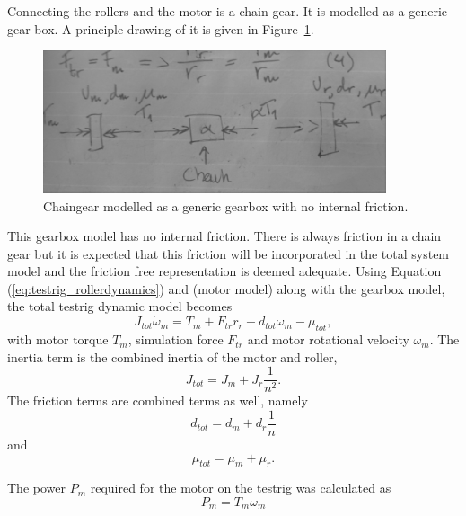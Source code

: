 Connecting the rollers and the motor is a chain gear. It is modelled as a
generic gear box. A principle drawing of it is given in
Figure~\ref{fig:testrig_chaingear}. 
\begin{figure}[H]
    \label{fig:testrig_chaingear}
    \centering
    \includegraphics[width=0.9\textwidth]{./img/testrig_chaingear.png}
    \caption{Chaingear modelled as a generic gearbox with no internal friction.}
\end{figure}
This gearbox model has no internal friction.  There is always friction in a
chain gear but it is expected that this friction will be incorporated in the
total system model and the friction free representation is deemed adequate.
Using Equation (\ref{eq:testrig_rollerdynamics}) and (motor model) along with
the gearbox model, the total testrig dynamic model becomes
\begin{equation} \label{eq:testrig_totaldynamics}
    J_{tot} \dot{\omega}_m = T_m + F_{tr} r_r - d_{tot} \omega_m - \mu_{tot},
\end{equation}
with motor torque $T_m$, simulation force $F_{tr}$ and motor rotational velocity
$\omega_m$. The inertia term is the combined inertia of the motor and
roller,
\begin{equation} \label{eq:totalinertia}
    J_{tot} = J_m + J_r \frac{1} {n^2}.
\end{equation}
The friction terms are combined terms as well, namely
\begin{equation} \label{eq:testrig_totalvfric}
    d_{tot} = d_m + d_r \frac {1} {n}
\end{equation}
and
\begin{equation} \label{eq:testrig_totalfric}
    \mu_{tot} = \mu_m + \mu_r.
\end{equation}

The power $P_m$ required for the motor on the testrig was calculated as
\begin{equation} \label{eq:testrig_motorpower}
	P_m = T_m \omega_m
\end{equation}

